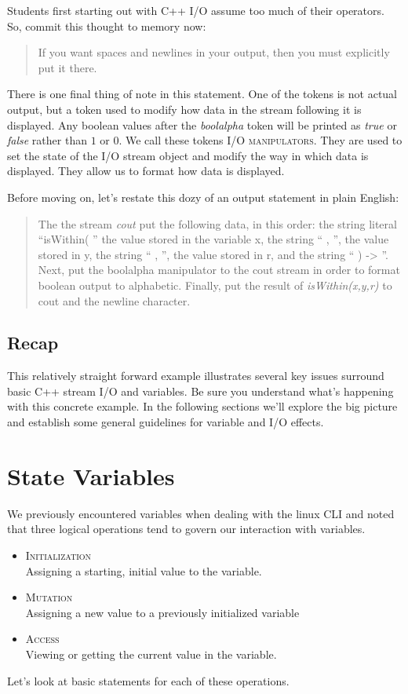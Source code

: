 \documentclass[]{tufte-handout}
\begin{document}
Students first starting out with C++ I/O assume too much of their operators. So, commit this thought to memory now:
\begin{quote}
If you want spaces and newlines in your output, then you must explicitly put it there.
\end{quote}


There is one final thing of note in this statement. One of the tokens is not actual output, but a token used to modify how data in the stream following it is displayed. Any boolean values after the \textit{boolalpha} token will be printed as \textit{true} or \textit{false} rather than $1$ or $0$.  We call these tokens \textsc{I/O manipulators}. They are used to set the state of the I/O stream object and modify the way in which data is displayed.  They allow us to format how data is displayed. 

Before moving on, let's restate this dozy of an output statement in plain English:
\begin{quote}
The the stream \textit{cout} put the following data, in this order: the string literal ``isWithin( '' the value stored in the variable x, the string `` , '', the value stored in y, the string `` , '', the value stored in r, and the string `` ) -> ''. Next, put the boolalpha manipulator to the cout stream in order to format boolean output to alphabetic. Finally, put the result of \textit{isWithin(x,y,r)} to cout and the newline character. 
\end{quote}

\subsection{Recap}

This relatively straight forward example illustrates several key issues surround basic C++ stream I/O and variables.  Be sure you understand what's happening with this concrete example. In the following sections we'll explore the big picture and establish some general guidelines for variable and I/O effects.

\section{State Variables}

We previously encountered variables when dealing with the linux CLI and noted that three logical operations tend to govern our interaction with variables.
\begin{itemize}
\item \textsc{Initialization} \\
Assigning a starting, initial value to the variable.
\item \textsc{Mutation} \\
Assigning a new value to a previously initialized variable
\item \textsc{Access} \\
Viewing or getting the current value in the variable.
\end{itemize}
Let's look at basic statements for each of these operations.
\end{document}
